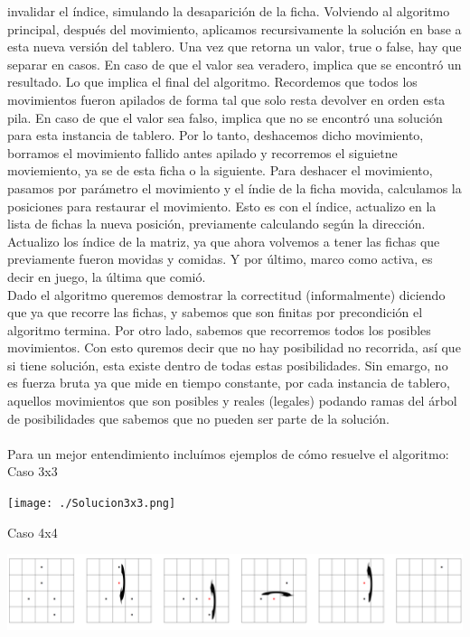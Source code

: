invalidar el índice, simulando la desaparición de la ficha.
Volviendo al algoritmo principal, después del movimiento, aplicamos recursivamente la solución en base a esta nueva versión del tablero.
Una vez que retorna un valor, true o false, hay que separar en casos.
En caso de que el valor sea veradero, implica que se encontró un resultado. Lo que implica el final del algoritmo. Recordemos que todos los movimientos fueron apilados de forma tal que solo resta devolver en orden esta pila.
En caso de que el valor sea falso, implica que no se encontró una solución para esta instancia de tablero. Por lo tanto, deshacemos dicho movimiento, borramos el movimiento fallido antes apilado y recorremos el siguietne moviemiento, ya se de esta ficha o la siguiente.
Para deshacer el movimiento, pasamos por parámetro el movimiento y el índie de la ficha movida, calculamos la posiciones para restaurar el movimiento. Esto es con el índice, actualizo en la lista de fichas la nueva posición, previamente calculando según la dirección. 
Actualizo los índice de la matriz, ya que ahora volvemos a tener las fichas que previamente fueron movidas y comidas. Y por último, marco como activa, es decir en juego, la última que comió.\\
Dado el algoritmo queremos demostrar la correctitud (informalmente) diciendo que ya que recorre las fichas, y sabemos que son finitas por precondición el algoritmo termina.
Por otro lado, sabemos que recorremos todos los posibles movimientos. Con esto quremos decir que no hay posibilidad no recorrida, así que si tiene solución, esta existe dentro
de todas estas posibilidades. Sin emargo, no es fuerza bruta ya que mide en tiempo constante, por cada instancia de tablero, aquellos movimientos que son posibles y reales (legales) podando ramas del árbol de posibilidades que sabemos que no pueden ser parte de la solución.\\
\\
Para un mejor entendimiento incluímos ejemplos de cómo resuelve el algoritmo:\\

{\huge Caso 3x3}
\begin {center}
\texttt{[image: ./Solucion3x3.png]}\\
\end {center}

{\huge Caso 4x4}
\begin {center}
\includegraphics[width=16cm]{./Solucion4x4.png}\\
\end {center}

